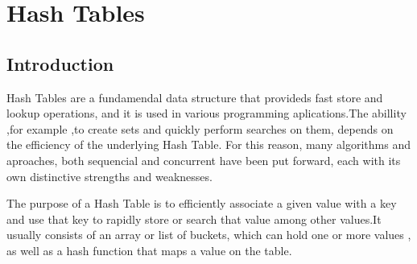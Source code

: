 \def\<#1>{\textit{#1}}

\chapter{Hash Tables}
\section{Introduction}

Hash Tables are a fundamendal data structure that provideds fast store and lookup operations, and it is used in various programming aplications.The abillity ,for example ,to create sets and quickly perform searches on them, depends on the efficiency of the underlying Hash Table. For this reason, many algorithms and aproaches, both sequencial and concurrent have been put forward, each with its own distinctive strengths and weaknesses. 

The purpose of a Hash Table is to efficiently associate a given value with a key and use that key to rapidly store or search that value among other values.It usually consists of an array or list of buckets, which can hold one or more values , as well as a hash function that maps a value on the table.
